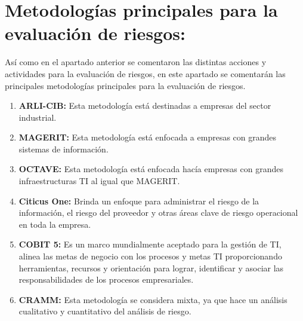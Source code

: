 \section{Metodologías principales para la evaluación de riesgos:}
Así como en el apartado anterior se comentaron las distintas acciones y actividades para la evaluación de riesgos, en este apartado se comentarán las principales metodologías principales para la evaluación de riesgos.

\begin{enumerate}
\item {\bfseries ARLI-CIB:}
Esta metodología está destinadas a empresas del sector industrial.
\item {\bfseries MAGERIT:}
Esta metodología está enfocada a empresas con grandes sistemas de información.
\item {\bfseries OCTAVE:}
Esta metodología está enfocada hacía empresas con grandes infraestructuras TI al igual que MAGERIT.
\item {\bfseries Citicus One:}
Brinda un enfoque para administrar el riesgo de la información, el riesgo del proveedor y otras áreas clave de riesgo operacional en toda la empresa.
\item {\bfseries COBIT 5:}
Es un marco mundialmente aceptado para la gestión de TI, alinea las metas de negocio con los procesos y metas TI proporcionando herramientas, recursos y orientación para lograr, identificar y asociar las responsabilidades de los procesos  empresariales.
\item {\bfseries CRAMM:}
Esta metodología se considera mixta, ya que hace un análisis cualitativo y cuantitativo del análisis de riesgo.
\end{enumerate}



